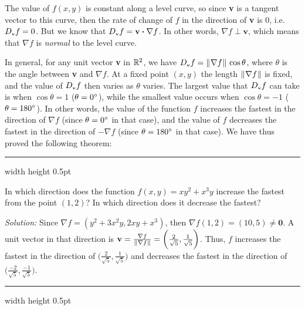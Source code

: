 The value of $f(x,y)$ is constant along a level curve, so since \textbf{v} is a tangent vector to this curve, then
the rate of change of $f$ in the direction of \textbf{v} is 0, i.e. $D_{\scriptscriptstyle \textbf{v}}f = 0$. 
But we know that
$D_{\scriptscriptstyle \textbf{v}}f = \textbf{v} \bm{\cdot} \nabla f$.
In other words, $\nabla f
\perp \textbf{v}$, which means that $\nabla f$ is \emph{normal} to the level curve.

In general, for any unit vector \textbf{v} in $\mathbb{R}^{2}$, we have 
$D_{\scriptscriptstyle \textbf{v}}f = \lVert\mspace{1mu}\nabla f\mspace{1mu}\rVert\,\cos \theta$, where $\theta$ is the angle between \textbf{v} and $\nabla f$.
At a fixed point $(x,y)$ the length $\lVert\mspace{1mu}\nabla f\mspace{1mu}\rVert$ is fixed,
and the value of $D_{\scriptscriptstyle \textbf{v}}f$ then varies as $\theta$ varies. The largest value
that $D_{\scriptscriptstyle \textbf{v}}f$ can take is when $\cos \theta = 1$ ($\theta = 0^\circ$), while the smallest value occurs
when $\cos \theta = -1$ ($\theta = 180^\circ$). In other words, the value of the function $f$ increases the fastest
in the direction of $\nabla f$ (since $\theta = 0^\circ$ in that case), and the value of $f$ decreases the fastest in
the direction of $-\nabla f$ (since $\theta = 180^\circ$ in that case). We have thus proved the following theorem:


\vspace{3mm}
\hrule width \textwidth height 0.5pt
\begin{exmp}
 In which direction does the function $f(x,y) = xy^2 + x^3 y$ increase the fastest from the point $(1,2)$?
 In which direction does it decrease the fastest?\vspace{1mm}
 \par\noindent\emph{Solution:} Since $\nabla f = (y^2 + 3x^2 y, 2xy + x^3)$, then
 $\nabla f(1,2) = (10,5) \ne \textbf{0}$. 
 A unit vector in that direction is $\textbf{v} =
 \frac{\nabla f}{\lVert\mspace{1mu}\nabla f\mspace{1mu}\rVert} = \biggl( \frac{2}{\sqrt{5}}, \frac{1}{\sqrt{5}} \biggr)$. 
 Thus, $f$ increases the
 fastest in the direction of $\biggl( \frac{2}{\sqrt{5}}, \frac{1}{\sqrt{5}} \biggr)$ and decreases the fastest in
 the direction of $\biggl( \frac{-2}{\sqrt{5}}, \frac{-1}{\sqrt{5}} \biggr)$.
\end{exmp}
\hrule width \textwidth height 0.5pt
\vspace{3mm}


